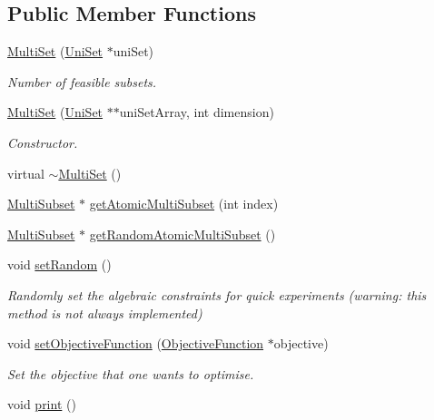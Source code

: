 \subsection*{Public Member Functions}
\begin{DoxyCompactItemize}
\item 
\hyperlink{classMultiSet_aa6ec2e2e6ef524acde12c795629f08c8}{Multi\-Set} (\hyperlink{classUniSet}{Uni\-Set} $\ast$uni\-Set)
\begin{DoxyCompactList}\small\item\em Number of feasible subsets. \end{DoxyCompactList}\item 
\hyperlink{classMultiSet_abafc2f4fb50484d3aabdd744dc1d6cc5}{Multi\-Set} (\hyperlink{classUniSet}{Uni\-Set} $\ast$$\ast$uni\-Set\-Array, int dimension)
\begin{DoxyCompactList}\small\item\em Constructor. \end{DoxyCompactList}\item 
virtual \hyperlink{classMultiSet_a3ad638b1613083b97a53ea58e9060a4d}{$\sim$\-Multi\-Set} ()
\item 
\hyperlink{classMultiSubset}{Multi\-Subset} $\ast$ \hyperlink{classMultiSet_a48a6504163110d377db974d6ea5bd8fe}{get\-Atomic\-Multi\-Subset} (int index)
\item 
\hyperlink{classMultiSubset}{Multi\-Subset} $\ast$ \hyperlink{classMultiSet_afe3111c90692136b5141a4c5b96e2da3}{get\-Random\-Atomic\-Multi\-Subset} ()
\item 
\hypertarget{classMultiSet_aac2d5ee0afa30a8f565f29204a677cd9}{void \hyperlink{classMultiSet_aac2d5ee0afa30a8f565f29204a677cd9}{set\-Random} ()}\label{classMultiSet_aac2d5ee0afa30a8f565f29204a677cd9}

\begin{DoxyCompactList}\small\item\em Randomly set the algebraic constraints for quick experiments (warning\-: this method is not always implemented) \end{DoxyCompactList}\item 
void \hyperlink{classMultiSet_a0c7e6fb6d2eb064cf6bf2fe7e810726a}{set\-Objective\-Function} (\hyperlink{classObjectiveFunction}{Objective\-Function} $\ast$objective)
\begin{DoxyCompactList}\small\item\em Set the objective that one wants to optimise. \end{DoxyCompactList}\item 
\hypertarget{classMultiSet_ab08f0a90d249cecc0f7931caa2632f48}{void \hyperlink{classMultiSet_ab08f0a90d249cecc0f7931caa2632f48}{print} ()}\label{classMultiSet_ab08f0a90d249cecc0f7931caa2632f48}


\end{DoxyCompactItemize}
